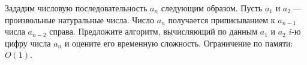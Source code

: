 \documentclass{article}
\begin{document}
Зададим числовую последовательность $a_n$ следующим образом. Пусть $a_1$ и $a_2$ --- произвольные натуральные числа. 
Число $a_n$ получается приписыванием к $a_{n-1}$ числа $a_{n-2}$ справа. Предложите алгоритм, вычисляющий по данным $a_1$ и $a_2$ $i$-ю цифру числа $a_n$ и оцените его временную сложность. 
Ограничение по памяти: $O(1)$.
\end{document}
